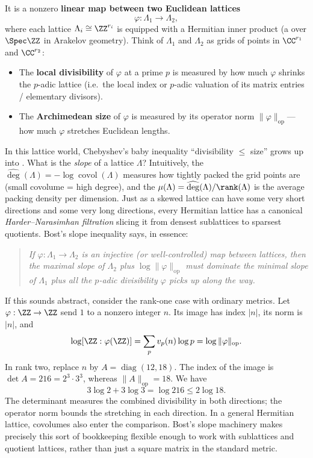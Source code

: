 It is a nonzero \textbf{linear map between two Euclidean lattices}
\[
  \varphi : \Lambda_1 \longrightarrow \Lambda_2,
\]
where each lattice \(\Lambda_i \cong \ZZ^{r_i}\) is equipped with a Hermitian inner product (a  over \(\Spec \ZZ\) in Arakelov geometry). Think of \(\Lambda_1\) and \(\Lambda_2\) as grids of points in \(\CC^{r_1}\) and \(\CC^{r_2}\):
\begin{itemize}
  \item The \textbf{local divisibility} of \(\varphi\) at a prime \(p\) is measured by how much \(\varphi\) shrinks the \(p\)-adic lattice (i.e.\ the local index or \(p\)-adic valuation of its matrix entries / elementary divisors).
  \item The \textbf{Archimedean size} of \(\varphi\) is measured by its operator norm \(\|\varphi\|_{\mathrm{op}}\)---how much \(\varphi\) stretches Euclidean lengths.
\end{itemize}
In this lattice world, Chebyshev's baby inequality ``divisibility \(\le\) size'' grows up into . What is the \emph{slope} of a lattice \(\Lambda\)? Intuitively, the  \(\widehat{\deg}(\Lambda) = -\log \operatorname{covol}(\Lambda)\) measures how tightly packed the grid points are (small covolume = high degree), and the  \(\mu(\Lambda) = \widehat{\deg}(\Lambda)/\rank(\Lambda)\) is the average packing density per dimension. Just as a skewed lattice can have some very short directions and some very long directions, every Hermitian lattice has a canonical \emph{Harder--Narasimhan filtration} slicing it from densest sublattices to sparsest quotients. Bost's slope inequality says, in essence:
\begin{quote}
\emph{If \(\varphi : \Lambda_1 \to \Lambda_2\) is an injective (or well-controlled) map between lattices, then the maximal slope of \(\Lambda_2\) plus \(\log\|\varphi\|_{\mathrm{op}}\) must dominate the minimal slope of \(\Lambda_1\) plus all the \(p\)-adic divisibility \(\varphi\) picks up along the way.}
\end{quote}
If this sounds abstract, consider the rank-one case with ordinary metrics. Let \(\varphi:\ZZ\to\ZZ\) send \(1\) to a nonzero integer \(n\). Its image has index \(|n|\), its norm is \(|n|\), and
\[
  \log[\ZZ:\varphi(\ZZ)]
     =\sum_p v_p(n)\log p=\log\|\varphi\|_{\mathrm{op}}.
\]
In rank two, replace \(n\) by \(A=\operatorname{diag}(12,18)\). The index of the image is \(\det A=216=2^3\cdot3^3\), whereas \(\|A\|_{\mathrm{op}}=18\). We have
\[
  3\log2+3\log3=\log216\leq2\log18.
\]
The determinant measures the combined divisibility in both directions; the operator norm bounds the stretching in each direction. In a general Hermitian lattice, covolumes also enter the comparison. Bost's slope machinery makes precisely this sort of bookkeeping flexible enough to work with sublattices and quotient lattices, rather than just a square matrix in the standard metric.


